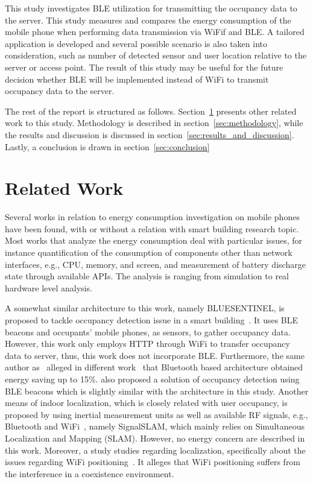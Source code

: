 \documentclass[journal]{vgtc}                %
\begin{document}
This study investigates BLE utilization for transmitting the occupancy data to the server. This study measures and compares the energy consumption of the mobile phone when performing data transmission via WiFif and BLE. A tailored application is developed and several possible scenario is also taken into consideration, such as number of detected sensor and user location relative to the server or access point. The result of this study may be useful for the future decision whether BLE will be implemented instead of WiFi to transmit occupancy data to the server.

The rest of the report is structured as follows. Section~\ref{sec:related_work} presents other related work to this study. Methodology is described in section~\ref{sec:methodology}, while the results and discussion is discussed in section~\ref{sec:results_and_discussion}. Lastly, a conclusion is drawn in section~\ref{sec:conclusion}

\section{Related Work} %
\label{sec:related_work}
Several works in relation to energy consumption investigation on mobile phones have been found, with or without a relation with smart building research topic. Most works that analyze the energy consumption deal with particular issues, for instance quantification of the consumption of components other than network interfaces, e.g., CPU, memory, and screen, and measurement of battery discharge state through available APIs. The analysis is ranging from simulation to real hardware level analysis.

A somewhat similar architecture to this work, namely BLUESENTINEL, is proposed to tackle occupancy detection issue in a smart building~\cite{Conte2014}. It uses BLE beacons and occupants' mobile phones, as sensors, to gather occupancy data. However, this work only employs HTTP through WiFi to transfer occupancy data to server, thus, this work does not incorporate BLE. Furthermore, the same author as~\cite{Conte2014} alleged in different work~\cite{Corna2015} that Bluetooth based architecture obtained energy saving up to 15\%. \cite{Corna2015} also proposed a solution of occupancy detection using BLE beacons which is slightly similar with the architecture in this study. Another means of indoor localization, which is closely related with user occupancy, is proposed by using inertial measurement units as well as available RF signals, e.g., Bluetooth and WiFi~\cite{Mirowski2013}, namely SignalSLAM, which mainly relies on Simultaneous Localization and Mapping (SLAM). However, no energy concern are described in this work. Moreover, a study studies regarding localization, specifically about the issues regarding WiFi positioning~\cite{Pei2012}. It alleges that WiFi positioning suffers from the interference in a coexistence environment.
\end{document}
